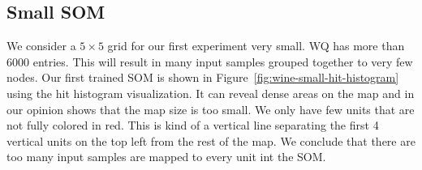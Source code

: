 \documentclass{acm_proc_article-sp}
\begin{document}
\subsection{Small SOM}

We consider a $5\times5$ grid for our first experiment very small. WQ has more than 6000 entries.
This will result in many input samples grouped together to very few nodes. Our first trained
SOM is shown in Figure~\ref{fig:wine-small-hit-histogram} using the hit histogram visualization.
It can reveal dense areas on the map and in our opinion shows that the map size is too small.
We only have few units that are not fully colored in red. This is kind of a vertical line separating
the first 4 vertical units on the top left from the rest of the map. We conclude that there are
too many input samples are mapped to every unit int the SOM.
\end{document}
